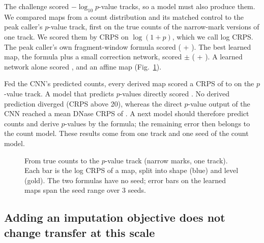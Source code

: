 \documentclass[pdflatex,sn-mathphys-num]{sn-jnl}
\newcommand{\lit}[1]{#1}
\begin{document}
The challenge scored $-\log_{\lit{10}} p$-value tracks, so a model must also produce them. We
compared maps from a count distribution and its matched control to the peak caller's $p$-value
track, first on the true counts of the narrow-mark versions of one track. We scored them by
CRPS on $\log(\lit{1}+p)$, which we call log CRPS. The peak caller's own fragment-window formula
scored \pFrag{} (\pFragOS{} + \pFragSE{}). The best learned map, the formula plus a small
correction network, scored \pFm{} $\pm$ \pFmS{} (\pFmOS{} + \pFmSE{}). A learned network alone
scored \pMlp{}, and an affine map \pAff{} (Fig.~\ref{fig:pmap}).

Fed the CNN's predicted counts, every derived map scored a CRPS of \pChainLo{} to \pChainHi{} on
the $p$-value track. A model that predicts $p$-values directly scored \pOldD{}. No derived
prediction diverged (CRPS above \lit{20}), whereas the direct $p$-value output of the CNN
reached a mean DNase CRPS of \pDirectDnD{}. A next model should therefore predict counts and
derive $p$-values by the formula; the remaining error then belongs to the count model. These
results come from one track and one seed of the count model.

\begin{figure}[t]
\centering
{}
\caption{From true counts to the $p$-value track (narrow marks, one track). Each bar is the
log CRPS of a map, split into shape (blue) and level (gold). The two formulas have no seed;
error bars on the learned maps span the seed range over \lit{3} seeds.}\label{fig:pmap}
\end{figure}

\subsection{Adding an imputation objective does not change transfer at this scale}\label{sec:r10}
\end{document}
